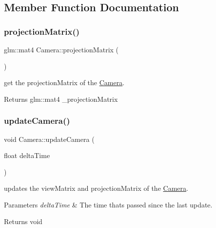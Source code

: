 \subsection{Member Function Documentation}
\mbox{\label{class_camera_a2eca875ed162335c5c8a3907d8674716}} 
\subsubsection{\texorpdfstring{projection\+Matrix()}{projectionMatrix()}}
{\footnotesize\ttfamily glm\+::mat4 Camera\+::projection\+Matrix (\begin{DoxyParamCaption}{ }\end{DoxyParamCaption})\hspace{0.3cm}{\ttfamily [inline]}}



get the projection\+Matrix of the \hyperlink{class_camera}{Camera}. 

\begin{DoxyReturn}{Returns}
glm\+::mat4 \+\_\+projection\+Matrix 
\end{DoxyReturn}
\mbox{\label{class_camera_ac9e359b0a6c41091a0eac46a869790bf}} 
\subsubsection{\texorpdfstring{update\+Camera()}{updateCamera()}}
{\footnotesize\ttfamily void Camera\+::update\+Camera (\begin{DoxyParamCaption}\item[{float}]{delta\+Time }\end{DoxyParamCaption})\hspace{0.3cm}{\ttfamily [virtual]}}



updates the view\+Matrix and projection\+Matrix of the \hyperlink{class_camera}{Camera}. 


\begin{DoxyParams}{Parameters}
{\em delta\+Time} & The time that\textquotesingle{}s passed since the last update. \\
\hline
\end{DoxyParams}
\begin{DoxyReturn}{Returns}
void 
\end{DoxyReturn}
\mbox{\label{class_camera_aa77dcf47815f0549e40111baf0998771}} 
